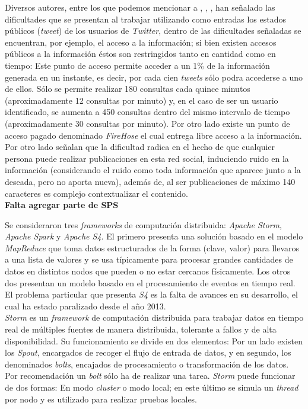 Diversos autores, entre los que podemos mencionar a \cite{VanDeVoort}, \cite{EventDetectionInTwitter}, \cite{Maldonado}, han señalado las dificultades que se presentan al trabajar utilizando como entradas los estados públicos (\textit{tweet}) de los usuarios de \textit{Twitter}, dentro de las dificultades señaladas se encuentran, por ejemplo, el acceso a la información; si bien existen accesos públicos a la información éstos son restringidos tanto en cantidad como en tiempo: Este punto de acceso permite acceder a un 1\% de la información generada en un instante, es decir, por cada cien \textit{tweets} sólo podra accederse a uno de ellos. Sólo se permite realizar 180 consultas cada quince minutos (aproximadamente 12 consultas por minuto) y, en el caso de ser un usuario identificado, se aumenta a 450 consultas dentro del mismo intervalo de tiempo (aproximadamente 30 consultas por minuto). Por otro lado existe un punto de acceso pagado denominado \textit{FireHose} el cual entrega libre acceso a la información.\\

Por otro lado \cite{VanDeVoort} señalan que la dificultad radica en el hecho de que cualquier persona puede realizar publicaciones en esta red social, induciendo ruido en la información (considerando el ruido como toda información que aparece junto a la deseada, pero no aporta nueva), además de, al ser publicaciones de máximo 140 caracteres es complejo contextualizar el contenido.\\ 	
\textbf{Falta agregar parte de SPS}

Se consideraron tres \textit{frameworks} de computación distribuida: \textit{Apache Storm}, \textit{Apache Spark} y \textit{Apache S4}. El primero presenta una solución basado en el modelo \textit{MapReduce} que toma datos estructurados de la forma (clave, valor) para llevaros a una lista de valores y se usa típicamente para procesar grandes cantidades de datos en distintos nodos que pueden o no estar cercanos físicamente. Los otros dos presentan un modelo basado en el procesamiento de eventos en tiempo real. El problema particular que presenta \textit{S4} es la falta de avances en su desarrollo, el cual ha estado paralizado desde el año 2013.\\ 

\textit{Storm} es un \textit{framework} de computación distribuida para trabajar datos en tiempo real de múltiples fuentes de manera distribuida, tolerante a fallos y de alta disponibilidad. Su funcionamiento se divide en dos elementos: Por un lado existen los \textit{Spout}, encargados de recoger el flujo de entrada de datos, y en segundo, los denominados \textit{bolts}, encajados de procesamiento o transformación de los datos. Por recomendación un \textit{bolt} sólo ha de realizar una tarea. \textit{Storm} puede funcionar de dos formas: En modo \textit{cluster} o modo local; en este último se simula un \textit{thread} por nodo y es utilizado para realizar pruebas locales.\\

